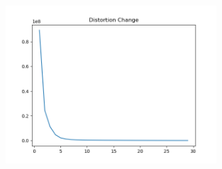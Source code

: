 \documentclass[12pt]{article}
\begin{document}
    \begin{figure}[H]
        \centering
        \includegraphics[width=0.70\textwidth]{Q5/distortion_large.png}
    \end{figure}
\end{document}

